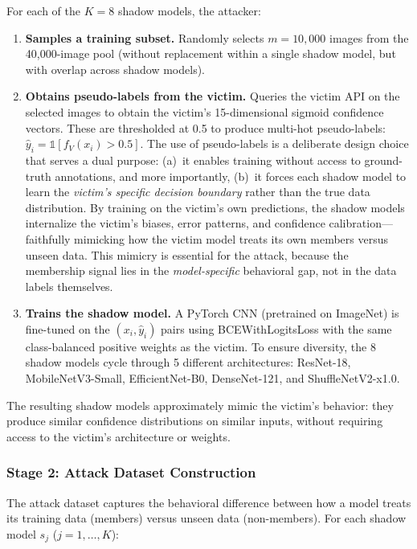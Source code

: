 \documentclass[conference]{IEEEtran}
\begin{document}
For each of the $K = 8$ shadow models, the attacker:

\begin{enumerate}[leftmargin=*]
    \item \textbf{Samples a training subset.} Randomly selects $m = 10{,}000$ images from the 40,000-image pool (without replacement within a single shadow model, but with overlap across shadow models).
    
    \item \textbf{Obtains pseudo-labels from the victim.} Queries the victim API on the selected images to obtain the victim's 15-dimensional sigmoid confidence vectors. These are thresholded at 0.5 to produce multi-hot pseudo-labels: $\hat{y}_i = \mathbb{1}[f_V(x_i) > 0.5]$. The use of pseudo-labels is a deliberate design choice that serves a dual purpose: (a)~it enables training without access to ground-truth annotations, and more importantly, (b)~it forces each shadow model to learn the \textit{victim's specific decision boundary} rather than the true data distribution. By training on the victim's own predictions, the shadow models internalize the victim's biases, error patterns, and confidence calibration---faithfully mimicking how the victim model treats its own members versus unseen data. This mimicry is essential for the attack, because the membership signal lies in the \textit{model-specific} behavioral gap, not in the data labels themselves.
    
    \item \textbf{Trains the shadow model.} A PyTorch CNN (pretrained on ImageNet) is fine-tuned on the $(x_i, \hat{y}_i)$ pairs using BCEWithLogitsLoss with the same class-balanced positive weights as the victim. To ensure diversity, the 8 shadow models cycle through 5 different architectures: ResNet-18, MobileNetV3-Small, EfficientNet-B0, DenseNet-121, and ShuffleNetV2-x1.0.
\end{enumerate}

The resulting shadow models approximately mimic the victim's behavior: they produce similar confidence distributions on similar inputs, without requiring access to the victim's architecture or weights.

\subsubsection{Stage 2: Attack Dataset Construction}

The attack dataset captures the behavioral difference between how a model treats its training data (members) versus unseen data (non-members). For each shadow model $s_j$ ($j = 1, \ldots, K$):
\end{document}
